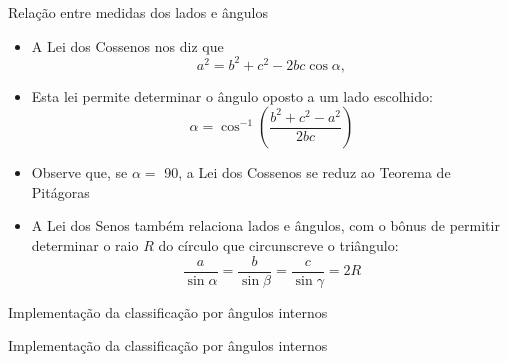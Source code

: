 \begin{frame}[fragile]{Relação entre medidas dos lados e ângulos}

    \begin{itemize}
        \item A Lei dos Cossenos nos diz que
        \[
            a^2 = b^2 + c^2 - 2bc\cos \alpha,
        \]
        \pause
        
        \item Esta lei permite determinar o ângulo oposto a um lado escolhido:
        \[
            \alpha = \cos^{-1} \left(\frac{b^2 + c^2 - a^2}{2bc}\right)
        \]
        \pause
        
        \item Observe que, se $\alpha =$ 90\textdegree, a Lei dos Cossenos se reduz ao 
            Teorema de Pitágoras
        \pause

        \item A Lei dos Senos também relaciona lados e ângulos, com o bônus de permitir 
            determinar o raio $R$ do círculo que circunscreve o triângulo:
        \[
            \frac{a}{\sin \alpha} = \frac{b}{\sin \beta} = \frac{c}{\sin \gamma} = 2R
        \]
    \end{itemize}

\end{frame}

\begin{frame}[fragile]{Implementação da classificação por ângulos internos}
\end{frame}

\begin{frame}[fragile]{Implementação da classificação por ângulos internos}
\end{frame}
